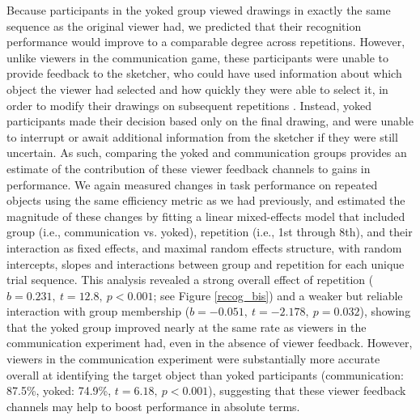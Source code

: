\documentclass[10pt,letterpaper]{article}
\begin{document}
Because participants in the yoked group viewed drawings in exactly the same sequence as the original viewer had, we predicted that their recognition performance would improve to a comparable degree across repetitions.
However, unlike viewers in the communication game, these participants were unable to provide feedback to the sketcher, who could have used information about which object the viewer had selected and how quickly they were able to select it, in order to modify their drawings on subsequent repetitions \cite{schober_understanding_1989}.
Instead, yoked participants made their decision based only on the final drawing, and were unable to interrupt or await additional information from the sketcher if they were still uncertain.
As such, comparing the yoked and communication groups provides an estimate of the contribution of these viewer feedback channels to gains in performance.
We again measured changes in task performance on repeated objects using the same efficiency metric as we had previously, and estimated the magnitude of these changes by fitting a linear mixed-effects model that included group (i.e., communication vs. yoked), repetition (i.e., 1st through 8th), and their interaction as fixed effects, and maximal random effects structure, with random intercepts, slopes and interactions between group and repetition for each unique trial sequence.
This analysis revealed a strong overall effect of repetition ($b = 0.231, ~t = 12.8,~p < 0.001$; see Figure \ref{recog_bis}) and a weaker but reliable interaction with group membership ($b = -0.051, ~t = -2.178, ~p = 0.032$), showing that the yoked group improved nearly at the same rate as viewers in the communication experiment had, even in the absence of viewer feedback. %
However, viewers in the communication experiment were substantially more accurate overall at identifying the target object than yoked participants (communication: 87.5\%, yoked: 74.9\%, $t = 6.18, ~p < 0.001$), suggesting that these viewer feedback channels may help to boost performance in absolute terms. %


\end{document}
